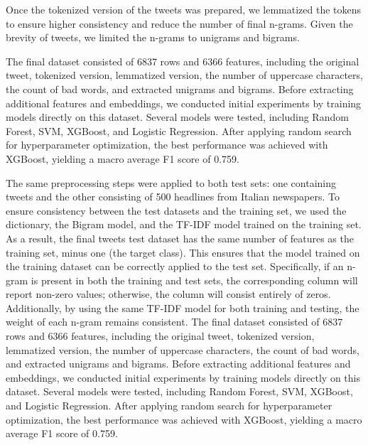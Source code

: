 Once the tokenized version of the tweets was prepared, we lemmatized the tokens to ensure higher consistency and reduce the number of final n-grams. Given the brevity of tweets, we limited the n-grams to unigrams and bigrams.

The final dataset consisted of 6837 rows and 6366 features, including the original tweet, tokenized version, lemmatized version, the number of uppercase characters, the count of bad words, and extracted unigrams and bigrams. Before extracting additional features and embeddings, we conducted initial experiments by training models directly on this dataset. Several models were tested, including Random Forest, SVM, XGBoost, and Logistic Regression.
After applying random search for hyperparameter optimization, the best performance was achieved with XGBoost, yielding a macro average F1 score of 0.759.

The same preprocessing steps were applied to both test sets: one containing tweets and the other consisting of 500 headlines from Italian newspapers.
To ensure consistency between the test datasets and the training set, we used the dictionary, the Bigram model, and the TF-IDF model trained on the training set.
As a result, the final tweets test dataset has the same number of features as the training set, minus one (the target class). This ensures that the model trained on the training dataset can be correctly applied to the test set.
Specifically, if an n-gram is present in both the training and test sets, the corresponding column will report non-zero values; otherwise, the column will consist entirely of zeros.
Additionally, by using the same TF-IDF model for both training and testing, the weight of each n-gram remains consistent.
The final dataset consisted of 6837 rows and 6366 features, including the original tweet, tokenized version, lemmatized version, the number of uppercase characters, the count of bad words, and extracted unigrams and bigrams.
Before extracting additional features and embeddings, we conducted initial experiments by training models directly on this dataset. Several models were tested, including Random Forest, SVM, XGBoost, and Logistic Regression. After applying random search for hyperparameter optimization, the best performance was achieved with XGBoost, yielding a macro average F1 score of 0.759.